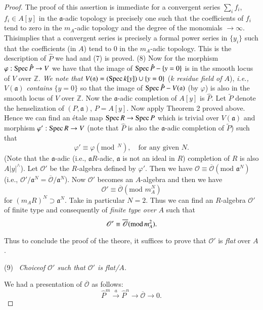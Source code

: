 \begin{proof}
The proof of this assertion is immediate for a convergent series
$\sum\limits_{i}f_{i}$, $f_{i}\in A[y]$ in the $\mathfrak{a}$-adic
topology is precisely one such that the coefficients of $f_{i}$ tend
to zero in the $m_{A}$-adic topology and the degree of the monomials
$\to \infty$.  This\pageoriginale implies that a convergent series is
precisely a formal power series in $\{y_{i}\}$ such that the
coefficients (in $A$) tend to $0$ in the $m_{A}$-adic topology. This
is the description of $\hat{P}$ we had and (7) is proved. (8) Now for
the morphism $\varphi:\operatorname{Spec} \hat{P}\to V$ we have that the image of
$\operatorname{Spec} \hat{P}-\{y=0\}$ is in the smooth locus of $V$ over
$\mathbb{Z}$. {\em We note that} $V(\mathfrak{a})=(\operatorname{Spec} k[y])\cup
  \{y=0\}$ ($k$ {\em residue field of $A$}), {\em i.e.,}
  $V(\mathfrak{a})$ {\em contains} $\{y=0\}$ so that the image of
  $\operatorname{Spec} \hat{P}-V(\mathfrak{a})$ (by $\varphi$) is also in the smooth locus
  of $V$ over $\mathbb{Z}$. Now the $\mathfrak{a}$-adic completion of
  $A[y]$ is $\hat{P}$. Let $\widetilde{P}$ denote the henselization of
  $(P,\mathfrak{a})$, $P=A[y]$. Now apply Theorem 2
  proved above. Hence we can find an \'etale map $\operatorname{Spec} R\to \operatorname{Spec} P$
  which is trivial over $V(\mathfrak{a})$ and morphism $\varphi':\operatorname{Spec}
  R\to V$ (note that $\hat{P}$ is also the $\mathfrak{a}$-adic
  completion of $\widetilde{P}$) such that
$$
\varphi'\equiv \varphi(\text{mod}~~{}^{N}),\quad\text{for any given~
}N.
$$
(Note that the $\mathfrak{a}$-adic (i.e., $\mathfrak{a}R$-adic,
$\mathfrak{a}$ is not an ideal in $R$) completion of $R$ is also
$A|y|^{\wedge}$). Let $\mathcal{O}'$ be the $R$-algebra defined by
$\varphi'$. Then we have
$\mathscr{O}\equiv\overline{\mathscr{O}}(\text{mod~}\mathfrak{a}^{N})$
(i.e.,
$\mathscr{O}'/\mathfrak{a}^{N}=\overline{\mathscr{O}}/\mathfrak{a}^{N}$). Now
$\mathscr{O}'$ becomes an $A$-algebra and then we have
$$
\mathscr{O}'\equiv \overline{\mathscr{O}}(\text{mod~}m^{N}_{A})  
$$
for $(m_{A}R)^{N}\supset \mathfrak{a}^{N}$. Take in particular
$N=2$. Thus we can find an $R$-algebra $\mathscr{O}'$ of finite type
and consequently of {\em finite type over} $A$ such that
$$
\mathscr{O}'\equiv\overline{\mathscr{O}}(\text{mod\,}m^{2}_{A}).
$$

Thus to conclude the proof of the theore, it suffices to prove that
$\mathscr{O}'$ is {\em flat} over $A$.

\smallskip
(9)~ {\em Choice\pageoriginale of $\mathscr{O}'$ such that
  $\mathscr{O}'$ is flat/$A$.}

We had a presentation of $\overline{\mathscr{O}}$ as follows:
$$
\hat{P}^{m}\xrightarrow{a}\hat{P}^{n}\to \overline{\mathscr{O}}\to 0.
$$


\end{proof}
